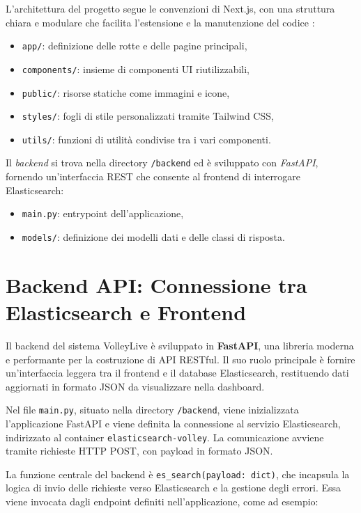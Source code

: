 \documentclass[a4paper,12pt]{report}
\begin{document}
L’architettura del progetto segue le convenzioni di Next.js, con una struttura chiara e modulare che facilita l’estensione e la manutenzione del codice : 
\begin{itemize}
    \item \texttt{app/}: definizione delle rotte e delle pagine principali,
    \item \texttt{components/}: insieme di componenti UI riutilizzabili,
    \item \texttt{public/}: risorse statiche come immagini e icone,
    \item \texttt{styles/}: fogli di stile personalizzati tramite Tailwind CSS,
    \item \texttt{utils/}: funzioni di utilità condivise tra i vari componenti.
\end{itemize}

Il \textit{backend} si trova nella directory \texttt{/backend} ed è sviluppato con \textit{FastAPI}, fornendo un'interfaccia REST che consente al frontend di interrogare Elasticsearch:
\begin{itemize}
    \item \texttt{main.py}: entrypoint dell’applicazione,
    \item \texttt{models/}: definizione dei modelli dati e delle classi di risposta.
\end{itemize}


\section{Backend API: Connessione tra Elasticsearch e Frontend}

Il backend del sistema VolleyLive è sviluppato in \textbf{FastAPI}, una libreria moderna e performante per la costruzione di API RESTful. Il suo ruolo principale è fornire un’interfaccia leggera tra il frontend e il database Elasticsearch, restituendo dati aggiornati in formato JSON da visualizzare nella dashboard.

Nel file \texttt{main.py}, situato nella directory \texttt{/backend}, viene inizializzata l’applicazione FastAPI e viene definita la connessione al servizio Elasticsearch, indirizzato al container \texttt{elasticsearch-volley}. La comunicazione avviene tramite richieste HTTP POST, con payload in formato JSON.

La funzione centrale del backend è \texttt{es\_search(payload: dict)}, che incapsula la logica di invio delle richieste verso Elasticsearch e la gestione degli errori. Essa viene invocata dagli endpoint definiti nell’applicazione, come ad esempio:
\end{document}
